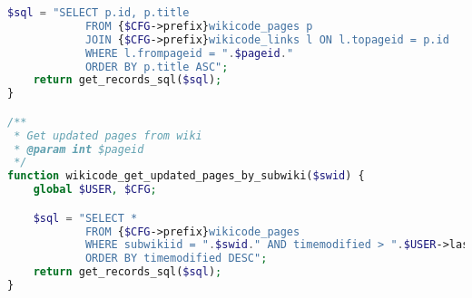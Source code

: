 \begin{lstlisting}[language=PHP]
    $sql = "SELECT p.id, p.title
            FROM {$CFG->prefix}wikicode_pages p
            JOIN {$CFG->prefix}wikicode_links l ON l.topageid = p.id
            WHERE l.frompageid = ".$pageid."
            ORDER BY p.title ASC";
    return get_records_sql($sql);
}

/**
 * Get updated pages from wiki
 * @param int $pageid
 */
function wikicode_get_updated_pages_by_subwiki($swid) {
    global $USER, $CFG;

    $sql = "SELECT *
            FROM {$CFG->prefix}wikicode_pages
            WHERE subwikiid = ".$swid." AND timemodified > ".$USER->lastlogin."
            ORDER BY timemodified DESC";
    return get_records_sql($sql);
}
\end{lstlisting}